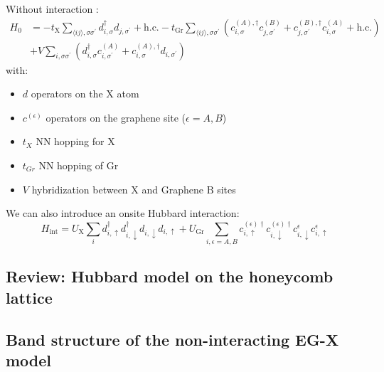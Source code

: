 \documentclass[../main.tex]{subfiles}
\begin{document}
Without interaction :
\begin{align}
    H_0 &= -t_{\mathrm{X}} \sum_{\langle ij \rangle, \sigma \sigma^{\prime}} d_{i, \sigma}^{\dagger} d_{j, \sigma^{\prime}} + \mathrm{h.c.}
    -t_{\mathrm{Gr}} \sum_{\langle ij \rangle, \sigma \sigma^{\prime}} \left(
    c_{i, \sigma}^{(A), \dagger} c_{j, \sigma^{\prime}}^{(B)} +
    c_{j, \sigma^{\prime}}^{(B), \dagger} c_{i, \sigma}^{(A)} + \mathrm{h.c.}
    \right) \\
    &+ V \sum_{i, \sigma \sigma^{\prime}} \left(
    d_{i, \sigma}^{\dagger} c_{i, \sigma^{\prime}}^{(A)} +
    c_{i, \sigma}^{(A), \dagger} d_{i, \sigma^{\prime}}
    \right)
    \label{eq:EG-X model Hamiltonian non-interacting}
\end{align}
with:
\begin{itemize}
    \item \(d\) operators on the X atom
    \item \(c^{(\epsilon)}\) operators on the graphene site (\(\epsilon = A, B\))
    \item \(t_X\) NN hopping for X
    \item \(t_{Gr}\) NN hopping of Gr
    \item \(V\) hybridization between \(\mathrm{X}\) and Graphene \(\mathrm{B}\) sites
\end{itemize}
We can also introduce an onsite Hubbard interaction:
\begin{equation}
    H_{\mathrm{int}} = U_{\mathrm{X}} \sum_{i} d_{i, \uparrow}^{\dagger} d_{i, \downarrow}^{\dagger} d_{i, \downarrow} d_{i, \uparrow}
    + U_{\mathrm{Gr}} \sum_{i, \epsilon=A, B} c_{i, \uparrow}^{(\epsilon) \dagger} c_{i, \downarrow}^{(\epsilon) \dagger} c_{i, \downarrow}^{\epsilon} c_{i, \uparrow}^{\epsilon}
\end{equation}

\subsection{Review: Hubbard model on the honeycomb lattice}\label{subsec:review:-hubbard-model-on-the-honeycomb-lattice}


\subsection{Band structure of the non-interacting EG-X model}\label{subsec:band-structure-of-the-non-interacting-eg-x-model}
\end{document}
